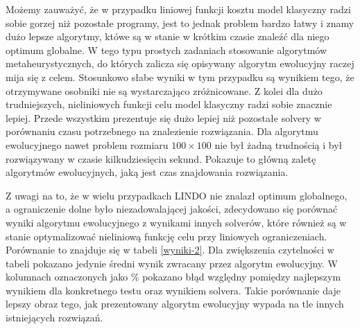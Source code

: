 Możemy zauważyć, że w przypadku liniowej funkcji kosztu model klasyczny radzi sobie gorzej niż pozostałe programy, jest to jednak problem bardzo 
łatwy i znamy dużo lepsze algorytmy, któwe są w stanie w krótkim czasie znaleźć dla niego optimum globalne. W tego typu prostych zadaniach stosowanie 
algorytmów metaheurystycznych, do których zalicza się opisywany algorytm ewolucyjny raczej mija się z celem. Stosunkowo słabe wyniki w tym przypadku 
są wynikiem tego, że otrzymywane osobniki nie są wystarczająco zróżnicowane. Z kolei dla dużo trudniejszych, nieliniowych 
funkcji celu model klasyczny radzi sobie znacznie lepiej. Przede wszystkim prezentuje się dużo lepiej niż pozostałe solvery w porównaniu czasu 
potrzebnego na znalezienie rozwiązania. Dla algorytmu ewolucyjnego nawet problem rozmiaru $100 \times 100$ nie był żadną trudnością i 
był rozwiązywany w czasie kilkudziesięciu sekund. Pokazuje to główną zaletę algorytmów ewolucyjnych, jaką jest czas znajdowania rozwiązania.

Z uwagi na to, że w wielu przypadkach LINDO nie znalazł optimum globalnego, a ograniczenie dolne było niezadowalającej jakości, zdecydowano się 
porównać wyniki algorytmu ewolucyjnego z wynikami innych solverów, które również są w stanie optymalizować nieliniową funkcję celu 
przy liniowych ograniczeniach. Porównanie to znajduje się w tabeli \ref{wyniki-2}. Dla zwiększenia czytelności w tabeli pokazano jedynie średni wynik 
zwracany przez algorytm ewolucyjny. W kolumnach oznaczonych jako \% pokazano błąd względny pomiędzy najlepszym wynikiem dla konkretnego testu oraz 
wynikiem solvera. Takie porównanie daje lepszy obraz tego, jak prezentowany algorytm ewolucyjny wypada na tle innych istniejących rozwiązań.

